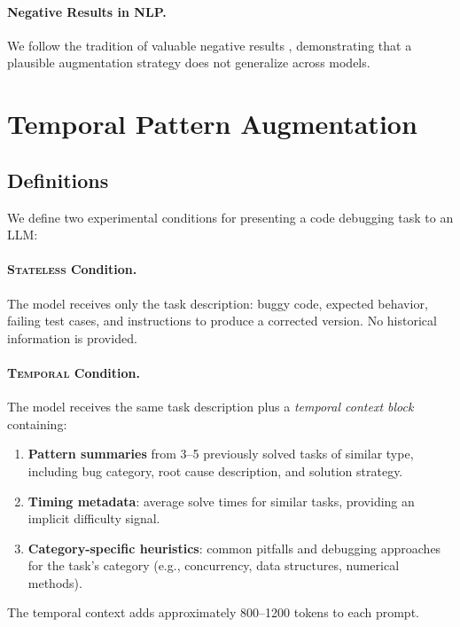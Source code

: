 \documentclass[11pt]{article}
\begin{document}
\paragraph{Negative Results in NLP.} We follow the tradition of valuable negative results \citep{rogers2020primer}, demonstrating that a plausible augmentation strategy does not generalize across models.

\section{Temporal Pattern Augmentation}
\label{sec:method}

\subsection{Definitions}

We define two experimental conditions for presenting a code debugging task to an LLM:

\paragraph{\textsc{Stateless} Condition.} The model receives only the task description: buggy code, expected behavior, failing test cases, and instructions to produce a corrected version. No historical information is provided.

\paragraph{\textsc{Temporal} Condition.} The model receives the same task description plus a \emph{temporal context block} containing:
\begin{enumerate}[nosep]
    \item \textbf{Pattern summaries} from 3--5 previously solved tasks of similar type, including bug category, root cause description, and solution strategy.
    \item \textbf{Timing metadata}: average solve times for similar tasks, providing an implicit difficulty signal.
    \item \textbf{Category-specific heuristics}: common pitfalls and debugging approaches for the task's category (e.g., concurrency, data structures, numerical methods).
\end{enumerate}

The temporal context adds approximately 800--1200 tokens to each prompt.
\end{document}
